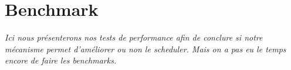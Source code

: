 \section{Benchmark}

\textit{Ici nous présenterons nos tests de performance afin de conclure si notre mécanisme permet d'améliorer ou non le scheduler. Mais on a pas eu le temps encore de faire les benchmarks.}